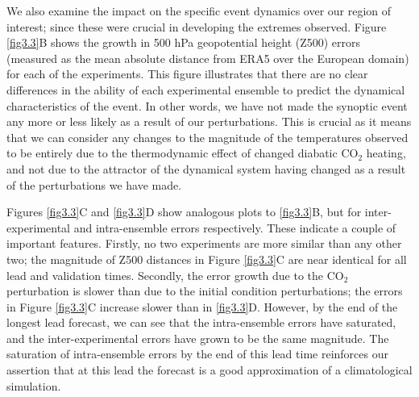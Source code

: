  We also examine the impact on the specific event dynamics over our region of interest; since these were crucial in developing the extremes observed. Figure \ref{fig3.3}B shows the growth in 500 hPa geopotential height (Z500) errors (measured as the mean absolute distance from ERA5 over the European domain) for each of the experiments. This figure illustrates that there are no clear differences in the ability of each experimental ensemble to predict the dynamical characteristics of the event. In other words, we have not made the synoptic event any more or less likely as a result of our perturbations. This is crucial as it means that we can consider any changes to the magnitude of the temperatures observed to be entirely due to the thermodynamic effect of changed diabatic CO$_2$ heating, and not due to the attractor of the dynamical system having changed as a result of the perturbations we have made.
  
  Figures \ref{fig3.3}C and \ref{fig3.3}D show analogous plots to \ref{fig3.3}B, but for inter-experimental and intra-ensemble errors respectively. These indicate a couple of important features. Firstly, no two experiments are more similar than any other two; the magnitude of Z500 distances in Figure \ref{fig3.3}C are near identical for all lead and validation times. Secondly, the error growth due to the CO$_2$ perturbation is slower than due to the initial condition perturbations; the errors in Figure \ref{fig3.3}C increase slower than in \ref{fig3.3}D. However, by the end of the longest lead forecast, we can see that the intra-ensemble errors have saturated, and the inter-experimental errors have grown to be the same magnitude. The saturation of intra-ensemble errors by the end of this lead time reinforces our assertion that at this lead the forecast is a good approximation of a climatological simulation.

